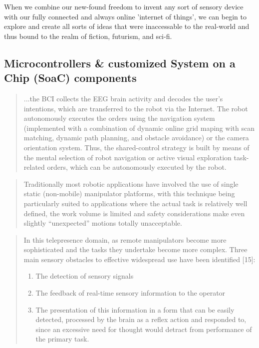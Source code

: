 \documentclass[a4paper,12pt]{report}
\begin{document}
When we combine our new-found freedom to invent any sort of sensory device with our fully connected and always online 'internet of things', we can begin to explore and create all sorts of ideas that were inaccessable to the real-world and thus bound to the realm of fiction, futurism, and sci-fi.
\subsection{Microcontrollers \& customized System on a Chip (SoaC) components}

\begin{quotation}{
	...the BCI collects the EEG brain activity and decodes the user's intentions, which are transferred to the robot via the Internet. The robot autonomously executes the orders using the navigation system (implemented with a combination of dynamic online grid maping with scan matching, dynamic path planning, and obstacle avoidance) or the camera orientation system. Thus, the shared-control strategy is built by means  of the mental selection of robot navigation or active visual exploration task-related orders, which can be autonomously executed by the robot.}
	\begin{flushright}
		\cite{6104414}
	\end{flushright}
\end{quotation}
\begin{quote}
	Traditionally most robotic applications have involved the use of single static (non-mobile) manipulator platforms, with this technique being particularly suited to applications where the actual task is relatively well defined, the work volume is limited and safety considerations make even slightly “unexpected” motions totally unacceptable.
	\begin{flushright}
		\cite{540147}
	\end{flushright}
\end{quote}
\begin{quote}
In this telepresence domain, as remote manipulators become more sophisticated and the tasks they undertake become more complex. Three main sensory obstacles to effective widespread use have been identified [15]:
	\begin{enumerate}
		\item The detection of sensory signals
		\item The feedback of real-time sensory information to the operator
		\item The presentation of this information in a form that can be easily detected, processed by the brain as a reflex action and responded to, since an excessive need for thought would detract from performance of the primary task.
	\end{enumerate}
	\begin{flushright}
		\cite{540147}
	\end{flushright}
\end{quote}
\end{document}
